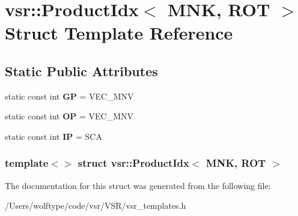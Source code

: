 \hypertarget{structvsr_1_1_product_idx_3_01_m_n_k_00_01_r_o_t_01_4}{\section{vsr\-:\-:Product\-Idx$<$ M\-N\-K, R\-O\-T $>$ Struct Template Reference}
\label{structvsr_1_1_product_idx_3_01_m_n_k_00_01_r_o_t_01_4}
}
\subsection*{Static Public Attributes}
\begin{DoxyCompactItemize}
\item 
\hypertarget{structvsr_1_1_product_idx_3_01_m_n_k_00_01_r_o_t_01_4_aa2c975d4fbf15a2a4aaf944e04bac269}{static const int {\bfseries G\-P} = V\-E\-C\-\_\-\-M\-N\-V}\label{structvsr_1_1_product_idx_3_01_m_n_k_00_01_r_o_t_01_4_aa2c975d4fbf15a2a4aaf944e04bac269}

\item 
\hypertarget{structvsr_1_1_product_idx_3_01_m_n_k_00_01_r_o_t_01_4_a2d3de4f1d8f68a4aa80584ce9f9497d1}{static const int {\bfseries O\-P} = V\-E\-C\-\_\-\-M\-N\-V}\label{structvsr_1_1_product_idx_3_01_m_n_k_00_01_r_o_t_01_4_a2d3de4f1d8f68a4aa80584ce9f9497d1}

\item 
\hypertarget{structvsr_1_1_product_idx_3_01_m_n_k_00_01_r_o_t_01_4_a76012ec706fbb378211f2b580a636316}{static const int {\bfseries I\-P} = S\-C\-A}\label{structvsr_1_1_product_idx_3_01_m_n_k_00_01_r_o_t_01_4_a76012ec706fbb378211f2b580a636316}

\end{DoxyCompactItemize}
\subsubsection*{template$<$$>$ struct vsr\-::\-Product\-Idx$<$ M\-N\-K, R\-O\-T $>$}



The documentation for this struct was generated from the following file\-:\begin{DoxyCompactItemize}
\item 
/\-Users/wolftype/code/vsr/\-V\-S\-R/vsr\-\_\-templates.\-h\end{DoxyCompactItemize}
